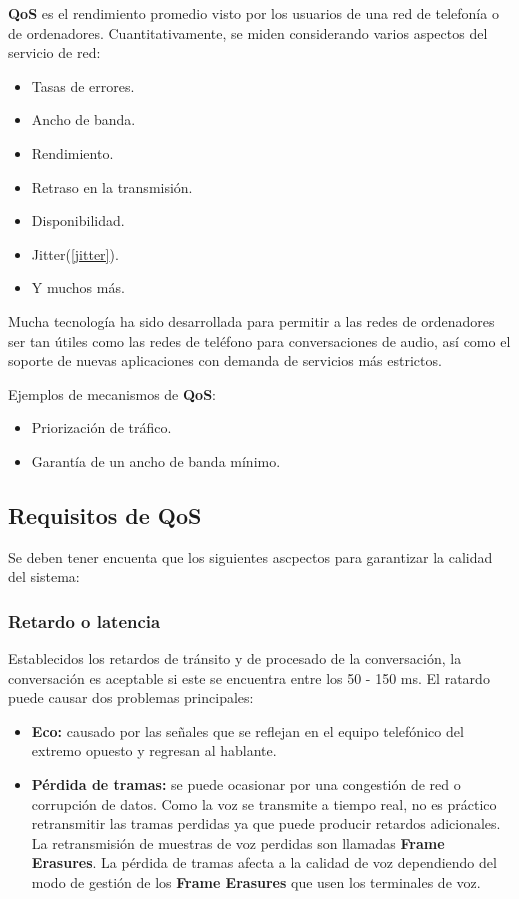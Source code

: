 \documentclass[a4paper, 11pt]{article} %
\begin{document}
		\textbf{QoS} es el rendimiento promedio visto por los usuarios de una red de telefonía o de ordenadores. Cuantitativamente, se miden considerando varios aspectos del servicio de red:
		\begin{itemize}
			\item Tasas de errores.
			\item Ancho de banda.
			\item Rendimiento.
			\item Retraso en la transmisión.
			\item Disponibilidad.
			\item Jitter(\ref{jitter}).
			\item Y muchos más.
		\end{itemize}
		
		Mucha tecnología ha sido desarrollada para permitir a las redes de ordenadores ser tan útiles como las redes de teléfono para conversaciones de audio, así como el soporte de nuevas aplicaciones con demanda de servicios más estrictos.
		
		Ejemplos de mecanismos de \textbf{QoS}:
		\begin{itemize}
			\item Priorización de tráfico.
			\item Garantía de un ancho de banda mínimo.
		\end{itemize}
	
	\subsection{Requisitos de QoS}
	Se deben tener encuenta que los siguientes ascpectos para garantizar la calidad del sistema:
		
		\subsubsection{Retardo o latencia}
		Establecidos los retardos de tránsito y de procesado de la conversación, la conversación es aceptable si este se encuentra entre los 50 - 150 ms. 
		El ratardo puede causar dos problemas principales:
		\begin{itemize}
			\item \textbf{Eco:} causado por las señales que se reflejan en el equipo telefónico del extremo opuesto y regresan al hablante.
			\item \textbf{Pérdida de tramas:} se puede ocasionar por una congestión de red o corrupción de datos. Como la voz se transmite a tiempo real, no es práctico retransmitir las tramas perdidas ya que puede producir retardos adicionales. La retransmisión de muestras de voz perdidas son llamadas \textbf{Frame Erasures}. La pérdida de tramas afecta a la calidad de voz dependiendo del modo de gestión de los \textbf{Frame Erasures} que usen los terminales de voz.
		\end{itemize}
		
\end{document}

